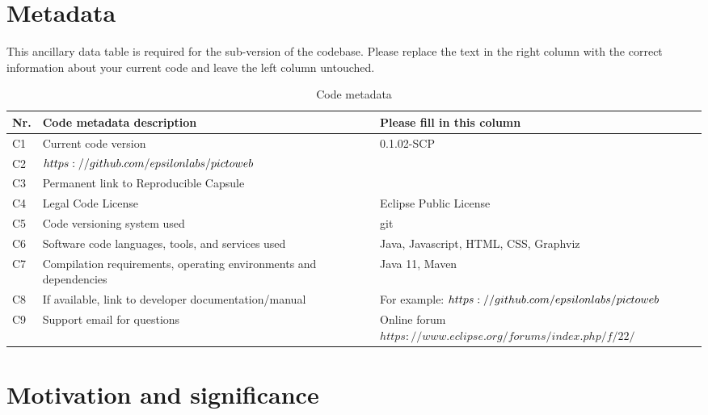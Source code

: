 \documentclass[preprint,12pt, a4paper]{elsarticle}
\begin{document}

\section*{Metadata}
\label{}

This ancillary data table is required for the sub-version of the codebase.
Please replace the text in the right column with the correct information
about your current code and leave the left column untouched.

\begin{table}[!h]
\begin{tabular}{|l|p{6.5cm}|p{6.5cm}|}
\hline
\textbf{Nr.} & \textbf{Code metadata description} & \textbf{Please fill in this column} \\
\hline
C1 & Current code version & 0.1.02-SCP\\
\hline
C2 & $https://github.com/epsilonlabs/picto\-web$ \\
\hline
C3  & Permanent link to Reproducible Capsule & \\
\hline
C4 & Legal Code License   & Eclipse Public License \\
\hline
C5 & Code versioning system used & git \\
\hline
C6 & Software code languages, tools, and services used & Java, Javascript, HTML, CSS, Graphviz \\
\hline
C7 & Compilation requirements, operating environments and dependencies & Java 11, Maven \\
\hline
C8 & If available, link to developer documentation/manual & For example: $https://github.com/epsilonlabs/picto\-web$ \\
\hline
C9 & Support email for questions & Online forum $https://www.eclipse.org/forums/index.php/f/22/$\\
\hline
\end{tabular}
\caption{Code metadata}
\label{}
\end{table}

\section{Motivation and significance}
%
%
%
%
\end{document}
